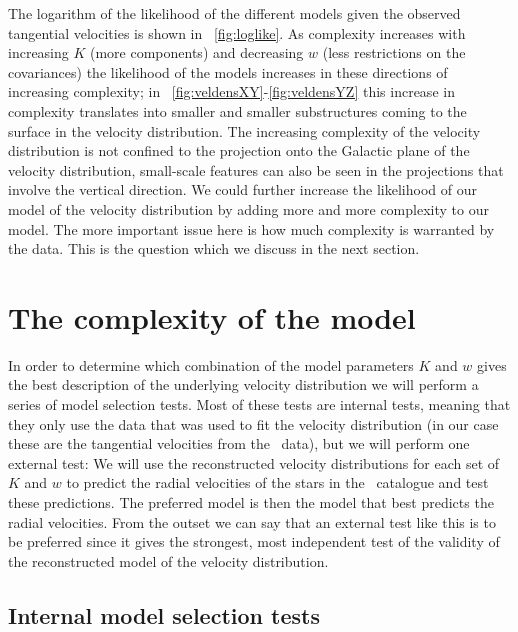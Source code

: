 The logarithm of the likelihood of the different models given the
observed tangential velocities is shown in
\figurename~\ref{fig:loglike}. As complexity increases with increasing
$K$ (more components) and decreasing $w$ (less restrictions on the
covariances) the likelihood of the models increases in these
directions of increasing complexity; in
\figuresname~\ref{fig:veldensXY}-\ref{fig:veldensYZ} this increase in
complexity translates into smaller and smaller substructures coming to
the surface in the velocity distribution. The increasing complexity of
the velocity distribution is not confined to the projection onto the
Galactic plane of the velocity distribution, small-scale features can
also be seen in the projections that involve the vertical
direction. We could further increase the likelihood of our model of
the velocity distribution by adding more and more complexity to our
model. The more important issue here is how much complexity is
warranted by the data. This is the question which we discuss in the
next section.



\section{The complexity of the model}

In order to determine which combination of the model parameters $K$
and $w$ gives the best description of the underlying velocity
distribution we will perform a series of model selection tests. Most
of these tests are internal tests, meaning that they only use the data
that was used to fit the velocity distribution (in our case these are
the tangential velocities from the \Hipparcos\ data), but we will
perform one external test: We will use the reconstructed velocity
distributions for each set of $K$ and $w$ to predict the radial
velocities of the stars in the \gcsabb\ catalogue and test these
predictions. The preferred model is then the model that best predicts
the radial velocities. From the outset we can say that an external
test like this is to be preferred since it gives the strongest, most
independent test of the validity of the reconstructed model of the
velocity distribution.


\subsection{Internal model selection tests}

